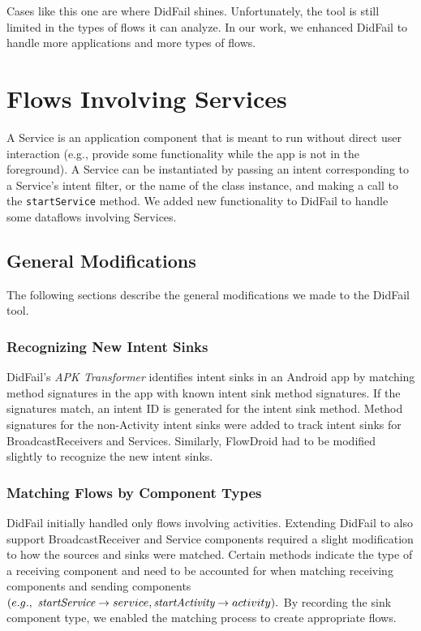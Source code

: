 Cases like this one are where DidFail shines. 
Unfortunately, the tool is still limited in the types of flows it can analyze. In our work, we enhanced DidFail to handle more applications and more types of flows.
\newpage
{}
\chapter{Flows Involving Services} \label{chap:services}
A Service is an application component that is meant to run without direct user interaction (e.g., provide some functionality while the app is not in the foreground). A Service can be instantiated by passing an intent corresponding to a Service's intent filter, or the name of the class instance, and making a call to the \texttt{startService} method. We added new functionality to DidFail to handle some dataflows involving Services.  

\section{General Modifications}
The following sections describe the general modifications we made to the DidFail tool.
\subsection{Recognizing New Intent Sinks}
DidFail's \emph{APK Transformer} identifies intent sinks in an Android app by matching method signatures in the app with known intent sink method signatures. If the signatures match, an intent ID is generated for the intent sink method. Method signatures for the non-Activity intent sinks were added to track intent sinks for BroadcastReceivers and Services. Similarly, FlowDroid had to be modified slightly to recognize the new intent sinks. 

\subsection{Matching Flows by Component Types}
DidFail initially handled only flows involving activities. Extending DidFail to also support BroadcastReceiver and Service components required a slight modification to how the sources and sinks were matched. Certain methods indicate the type of a receiving component and need to be accounted for when matching receiving components and sending components $(e.g.,\  \emph{startService} \rightarrow service, \emph{startActivity} \rightarrow activity).$ By recording the sink component type, we enabled the matching process to create appropriate flows.


